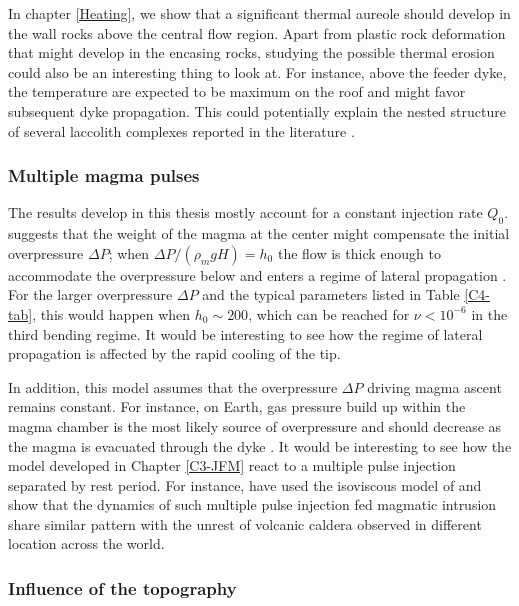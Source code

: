 In chapter \ref{Heating},  we show that a  significant thermal aureole
should develop in the wall rocks above the central flow region.  Apart
from  plastic rock  deformation  that might  develop  in the  encasing
rocks,  studying  the  possible  thermal  erosion  could  also  be  an
interesting thing to look at. For instance, above the feeder dyke, the
temperature are  expected to be  maximum on  the roof and  might favor
subsequent dyke propagation. This could potentially explain the nested
structure of  several laccolith  complexes reported in  the literature
\citep{E:2015tl,Rocchi:2010dn}.

\subsubsection*{Multiple magma pulses}
\label{sec:caref-descr-tip}

The  results develop  in this  thesis  mostly account  for a  constant
injection rate $Q_0$. \citet{Michaut:2011kg}  suggests that the weight
of the magma  at the center might compensate  the initial overpressure
$\Delta P$; when $\Delta P/(\rho_m g  H)=h_0$ the flow is thick enough
to accommodate the  overpressure below and enters a  regime of lateral
propagation  \citep{Michaut:2011kg}.   For   the  larger  overpressure
$\Delta P$  and the typical  parameters listed in  Table \ref{C4-tab},
this  would  happen when  $h_0\sim  200$,  which  can be  reached  for
$\nu<10^{-6}$ in the third bending  regime. It would be interesting to
see how  the regime of  lateral propagation  is affected by  the rapid
cooling of the tip.

In  addition, this  model  assumes that  the  overpressure $\Delta  P$
driving magma  ascent remains  constant. For  instance, on  Earth, gas
pressure build up  within the magma chamber is the  most likely source
of overpressure and should decrease  as the magma is evacuated through
the dyke \citep{Rivalta:2010em}.   It would be interesting  to see how
the model developed in Chapter  \ref{C3-JFM} react to a multiple pulse
injection    separated     by    rest    period.      For    instance,
\citet{Macedonio:2014et}   have   used   the   isoviscous   model   of
\citet{Michaut:2011kg}  and show  that the  dynamics of  such multiple
pulse injection fed magmatic intrusion  share similar pattern with the
unrest of volcanic  caldera observed in different  location across the
world.

\subsubsection*{Influence of the topography}
\label{sec:topo}

